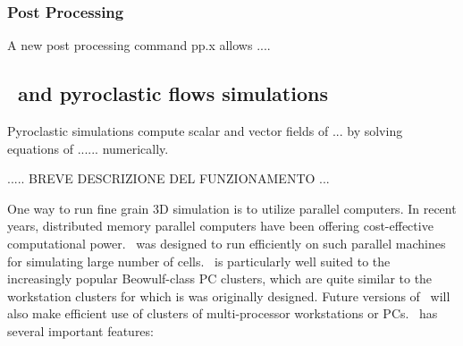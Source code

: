 \subsubsection*{Post Processing}

A new post processing command pp.x allows ....


\subsection{\PDAC\ and pyroclastic flows simulations}

Pyroclastic simulations compute scalar and vector fields of ... by solving
equations of ...... numerically. 

..... BREVE DESCRIZIONE DEL FUNZIONAMENTO ...

One way to run fine grain 3D simulation is to utilize parallel computers. 
In recent 
years, distributed memory parallel computers have been offering
cost-effective computational power.  \PDAC\ was designed to run efficiently
on such parallel machines for simulating large number of cells. 
\PDAC\ is particularly well suited to the increasingly popular Beowulf-class PC clusters, which are quite similar to the workstation clusters for which is was originally designed.
Future versions of \PDAC\ will also make efficient use of clusters of multi-processor workstations or PCs.
\prettypar
\PDAC\ has several important features: 

